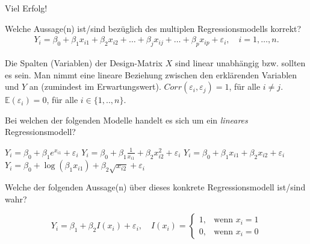 \documentclass[10pt,addpoints]{exam}
\begin{document}
Viel Erfolg!

\newpage

\begin{questions}

\question Welche Aussage(n) ist/sind bezüglich des multiplen Regressionsmodells korrekt?
\begin{eqnarray}
Y_i = \beta_0 + \beta_1x_{i1} + \beta_2x_{i2} + \dots + \beta_jx_{ij} + \dots + \beta_px_{ip} + \varepsilon_i, \quad i = 1, \dots, n.
\end{eqnarray}

\begin{choices}
\CorrectChoice Die Spalten (Variablen) der Design-Matrix $X$ sind linear unabhängig bzw. sollten es sein.
\CorrectChoice Man nimmt eine lineare Beziehung zwischen den erklärenden Variablen und $Y$ an (zumindest im Erwartungswert).
\choice $Corr(\varepsilon_i, \varepsilon_j) = 1$, für alle $i \ne j$.
\CorrectChoice $\mathbb{E}(\varepsilon_i) = 0$, für alle $i \in \{1,..,n\}$.
\end{choices}

\question Bei welchen der folgenden Modelle handelt es sich um ein \textit{lineares} Regressionsmodell?
\begin{choices}
\CorrectChoice $Y_i = \beta_0 + \beta_1 e^{x_{i1}} + \varepsilon_i$
\CorrectChoice $Y_i = \beta_0 + \beta_1 \frac{1}{x_{i1}} + \beta_2 x_{i2}^2 + \varepsilon_i$
\CorrectChoice $ Y_i = \beta_0 + \beta_1 x_{i1} + \beta_2 x_{i2} + \varepsilon_i$
\choice $ Y_i = \beta_0 + \log(\beta_1 x_{i1}) + \beta_2 \sqrt{x_{i2}} + \varepsilon_i$
\end{choices}

\question Welche der folgenden Aussage(n) über dieses konkrete Regressionsmodell ist/sind wahr?

\[
Y_i = \beta_1 + \beta_2 I(x_i) + \varepsilon_i, \quad I(x_i) = 
\begin{cases} 
1, & \text{wenn } x_i = 1 \\
0, & \text{wenn } x_i = 0 
\end{cases}
\]


\end{questions}
\end{document}
